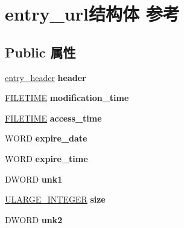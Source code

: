 \hypertarget{structentry__url}{}\section{entry\+\_\+url结构体 参考}
\label{structentry__url}
\subsection*{Public 属性}
\begin{DoxyCompactItemize}
\item 
\mbox{\label{structentry__url_aea72df71c9dbab48b87c2b234c61a5fb}} 
\hyperlink{structentry__header}{entry\+\_\+header} {\bfseries header}
\item 
\mbox{\label{structentry__url_a01a4cd79e67c069f0857cf74bb2ca403}} 
\hyperlink{struct___f_i_l_e_t_i_m_e}{F\+I\+L\+E\+T\+I\+ME} {\bfseries modification\+\_\+time}
\item 
\mbox{\label{structentry__url_a89a2b29009448bd879d52581dfd1b8a0}} 
\hyperlink{struct___f_i_l_e_t_i_m_e}{F\+I\+L\+E\+T\+I\+ME} {\bfseries access\+\_\+time}
\item 
\mbox{\label{structentry__url_aaa82bef959dcf36c94dd1ddf4b850a1d}} 
W\+O\+RD {\bfseries expire\+\_\+date}
\item 
\mbox{\label{structentry__url_a6e7bef30e6f1c0fc2612f865262aefa3}} 
W\+O\+RD {\bfseries expire\+\_\+time}
\item 
\mbox{\label{structentry__url_a7892f3929a883417a608bf9308bf4753}} 
D\+W\+O\+RD {\bfseries unk1}
\item 
\mbox{\label{structentry__url_a33f95e7b6aabc22519b5f1deac05c29a}} 
\hyperlink{struct___u_l_a_r_g_e___i_n_t_e_g_e_r}{U\+L\+A\+R\+G\+E\+\_\+\+I\+N\+T\+E\+G\+ER} {\bfseries size}
\item 
\mbox{\label{structentry__url_a99380418fadd1658ed8d966553ce572b}} 
D\+W\+O\+RD {\bfseries unk2}
\item 
\mbox{\label{structentry__url_a3aa9904f09af14db47dc106ea5aa0e9a}} 

\end{DoxyCompactItemize}
